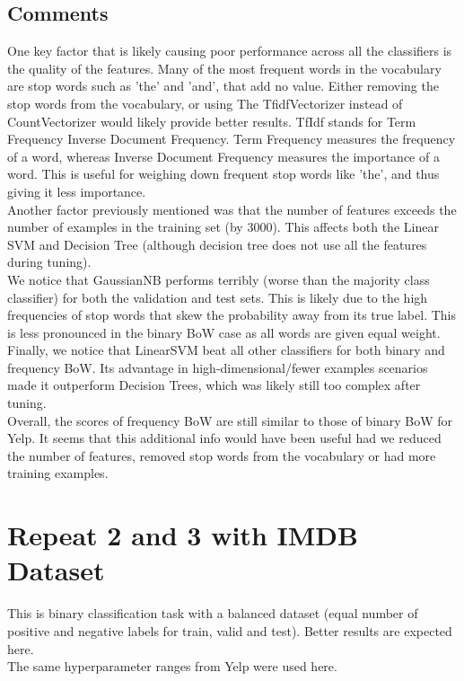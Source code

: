 \documentclass{article}
\begin{document}
\subsection{Comments}
One key factor that is likely causing poor performance across all the classifiers is the quality of the features. Many of the most frequent words in the vocabulary are stop words such as 'the' and 'and', that add no value. Either removing the stop words from the vocabulary, or using The TfidfVectorizer instead of CountVectorizer would likely provide better results. TfIdf stands for Term Frequency Inverse Document Frequency. Term Frequency measures the frequency of a word, whereas Inverse Document Frequency measures the importance of a word. This is useful for weighing down frequent stop words like 'the', and thus giving it less importance.\\
\newline
Another factor previously mentioned was that the number of features exceeds the number of examples in the training set (by 3000). This affects both the Linear SVM and Decision Tree (although decision tree does not use all the features during tuning).\\
\newline
We notice that GaussianNB performs terribly (worse than the majority class classifier) for both the validation and test sets. This is likely due to the high frequencies of stop words that skew the probability away from its true label. This is less pronounced in the binary BoW case as all words are given equal weight.\\
\newline
Finally, we notice that LinearSVM beat all other classifiers for both binary and frequency BoW. Its advantage in high-dimensional/fewer examples scenarios made it outperform Decision Trees, which was likely still too complex after tuning.\\
\newline
Overall, the scores of frequency BoW are still similar to those of binary BoW for Yelp. It seems that this additional info would have been useful had we reduced the number of features, removed stop words from the vocabulary or had more training examples.

\newpage
\section{Repeat 2 and 3 with IMDB Dataset}
This is binary classification task with a balanced dataset (equal number of positive and negative labels for train, valid and test). Better results are expected here. \\
\newline
The same hyperparameter ranges from Yelp were used here.
\end{document}
